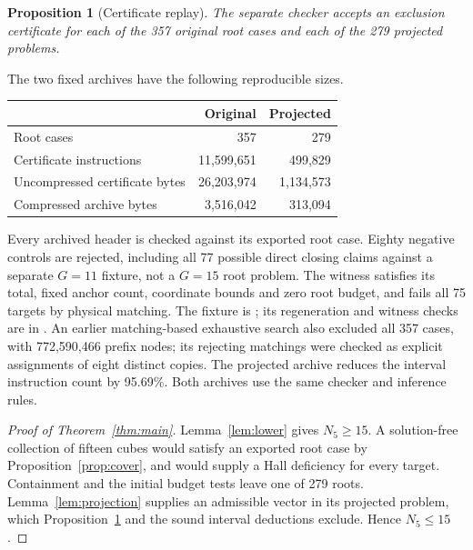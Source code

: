 \documentclass[11pt]{article}
\newtheorem{proposition}[theorem]{Proposition}
\theoremstyle{remark}
\begin{document}
\begin{proposition}[Certificate replay]\label{prop:replay}
The separate checker accepts an exclusion certificate for each of the
357 original root cases and each of the 279 projected problems.
\end{proposition}
The two fixed archives have the following reproducible sizes.
\begin{center}
\begin{tabular}{lrr}
\toprule
 & Original & Projected\\
\midrule
Root cases & 357 & 279\\
Certificate instructions & 11,599,651 & 499,829\\
Uncompressed certificate bytes & 26,203,974 & 1,134,573\\
Compressed archive bytes & 3,516,042 & 313,094\\
\bottomrule
\end{tabular}
\end{center}
Every archived header is checked against its exported root case. Eighty
negative controls are rejected, including all 77 possible direct closing
claims against a separate $G=11$ fixture, not a $G=15$ root problem.
The witness satisfies its total, fixed anchor count, coordinate bounds and
zero root budget, and fails all 75 targets by physical matching. The fixture
is ; its regeneration and witness
checks are in .
An earlier matching-based exhaustive search also excluded all 357 cases,
with 772,590,466 prefix nodes; its rejecting matchings were checked as explicit
assignments of eight distinct copies. The projected archive reduces the interval instruction count by 95.69\%.
Both archives use the same checker and inference rules.

\begin{proof}[Proof of Theorem~\ref{thm:main}]
Lemma~\ref{lem:lower} gives $N_5\ge15$. A solution-free collection of fifteen
cubes would satisfy an exported root case by Proposition~\ref{prop:cover},
and would supply a Hall deficiency for every target. Containment and the initial
budget tests leave one of 279 roots. Lemma~\ref{lem:projection} supplies an
admissible vector in its projected problem, which Proposition~\ref{prop:replay}
and the sound interval deductions exclude. Hence $N_5\le15$.
\end{proof}
\end{document}
